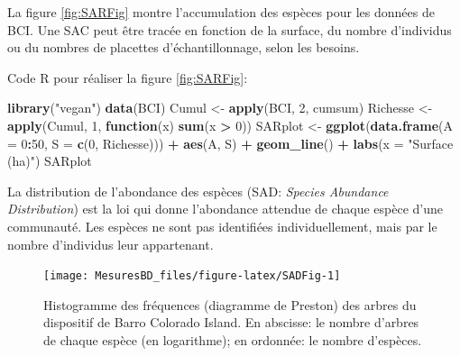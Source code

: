 \documentclass[
  11pt,
  french,
  a4paper,
  extrafontsizes,onecolumn,openright
  ]{memoir}
\newenvironment{Shaded}{\begin{snugshade}}{\end{snugshade}}
\newcommand{\ControlFlowTok}[1]{\textcolor[rgb]{0.13,0.29,0.53}{\textbf{#1}}}
\newcommand{\DataTypeTok}[1]{\textcolor[rgb]{0.13,0.29,0.53}{#1}}
\newcommand{\DecValTok}[1]{\textcolor[rgb]{0.00,0.00,0.81}{#1}}
\newcommand{\KeywordTok}[1]{\textcolor[rgb]{0.13,0.29,0.53}{\textbf{#1}}}
\newcommand{\NormalTok}[1]{#1}
\newcommand{\OperatorTok}[1]{\textcolor[rgb]{0.81,0.36,0.00}{\textbf{#1}}}
\newcommand{\StringTok}[1]{\textcolor[rgb]{0.31,0.60,0.02}{#1}}
\begin{document}
La figure \ref{fig:SARFig} montre l'accumulation des espèces pour les données de BCI.
Une SAC peut être tracée en fonction de la surface, du nombre d'individus ou du nombres de placettes d'échantillonnage, selon les besoins.

Code R pour réaliser la figure \ref{fig:SARFig}:

\scriptsize

\begin{Shaded}
\begin{Highlighting}[]
\KeywordTok{library}\NormalTok{(}\StringTok{"vegan"}\NormalTok{)}
\KeywordTok{data}\NormalTok{(BCI)}
\NormalTok{Cumul <-}\StringTok{ }\KeywordTok{apply}\NormalTok{(BCI, }\DecValTok{2}\NormalTok{, cumsum)}
\NormalTok{Richesse <-}\StringTok{ }\KeywordTok{apply}\NormalTok{(Cumul, }\DecValTok{1}\NormalTok{, }\ControlFlowTok{function}\NormalTok{(x) }\KeywordTok{sum}\NormalTok{(x }\OperatorTok{>}\StringTok{ }\DecValTok{0}\NormalTok{))}
\NormalTok{SARplot <-}\StringTok{ }\KeywordTok{ggplot}\NormalTok{(}\KeywordTok{data.frame}\NormalTok{(}\DataTypeTok{A =} \DecValTok{0}\OperatorTok{:}\DecValTok{50}\NormalTok{, }
                             \DataTypeTok{S =} \KeywordTok{c}\NormalTok{(}\DecValTok{0}\NormalTok{, Richesse))) }\OperatorTok{+}
\StringTok{  }\KeywordTok{aes}\NormalTok{(A, S) }\OperatorTok{+}
\StringTok{  }\KeywordTok{geom_line}\NormalTok{() }\OperatorTok{+}
\StringTok{  }\KeywordTok{labs}\NormalTok{(}\DataTypeTok{x =} \StringTok{"Surface (ha)"}\NormalTok{)}
\NormalTok{SARplot}
\end{Highlighting}
\end{Shaded}

\normalsize

La distribution de l'abondance des espèces (SAD: \emph{Species Abundance Distribution}) est la loi qui donne l'abondance attendue de chaque espèce d'une communauté.
Les espèces ne sont pas identifiées individuellement, mais par le nombre d'individus leur appartenant.



\scriptsize

\begin{figure}

{\centering \texttt{[image: MesuresBD\_files/figure-latex/SADFig-1]} 

}

\caption{Histogramme des fréquences (diagramme de Preston) des arbres du dispositif de Barro Colorado Island. En abscisse: le nombre d'arbres de chaque espèce (en logarithme); en ordonnée: le nombre d'espèces.}\label{fig:SADFig}
\end{figure}
\end{document}
